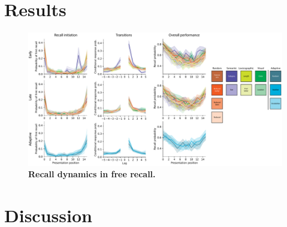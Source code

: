 \documentclass[10pt]{article}
\begin{document}





\section*{Results}

\begin{figure}[tp]
    \centering
    \includegraphics[width=\textwidth]{figures/recall_dynamics}
    \caption{\textbf{Recall dynamics in free recall.}}
    \label{fig:recall-dynamics}
\end{figure}








\section*{Discussion}
\end{document}
